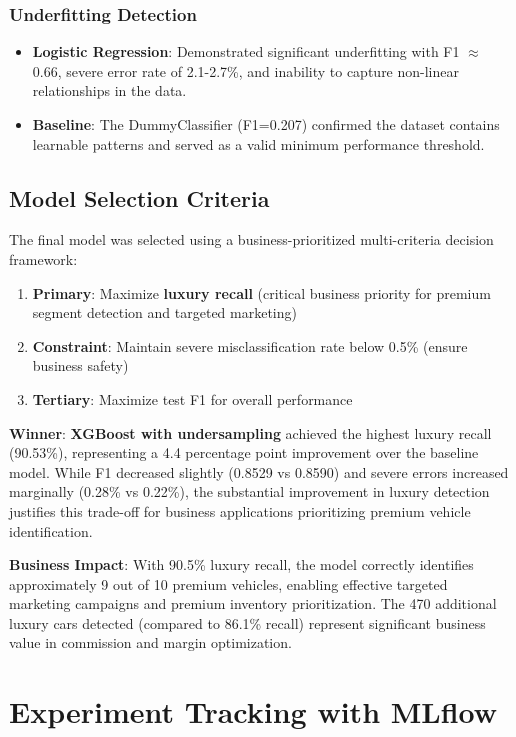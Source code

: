 \documentclass[12pt, a4paper]{article}
\begin{document}
\subsubsection{Underfitting Detection}
\begin{itemize}
    \item \textbf{Logistic Regression}: Demonstrated significant underfitting with F1 $\approx$ 0.66, severe error rate of 2.1-2.7\%, and inability to capture non-linear relationships in the data.
    \item \textbf{Baseline}: The DummyClassifier (F1=0.207) confirmed the dataset contains learnable patterns and served as a valid minimum performance threshold.
\end{itemize}

\subsection{Model Selection Criteria}
The final model was selected using a business-prioritized multi-criteria decision framework:
\begin{enumerate}
    \item \textbf{Primary}: Maximize \textbf{luxury recall} (critical business priority for premium segment detection and targeted marketing)
    \item \textbf{Constraint}: Maintain severe misclassification rate below 0.5\% (ensure business safety)
    \item \textbf{Tertiary}: Maximize test F1 for overall performance
\end{enumerate}

\textbf{Winner}: \textbf{XGBoost with undersampling} achieved the highest luxury recall (90.53\%), representing a 4.4 percentage point improvement over the baseline model. While F1 decreased slightly (0.8529 vs 0.8590) and severe errors increased marginally (0.28\% vs 0.22\%), the substantial improvement in luxury detection justifies this trade-off for business applications prioritizing premium vehicle identification.

\textbf{Business Impact}: With 90.5\% luxury recall, the model correctly identifies approximately 9 out of 10 premium vehicles, enabling effective targeted marketing campaigns and premium inventory prioritization. The 470 additional luxury cars detected (compared to 86.1\% recall) represent significant business value in commission and margin optimization.

\newpage
\section{Experiment Tracking with MLflow}
\end{document}
